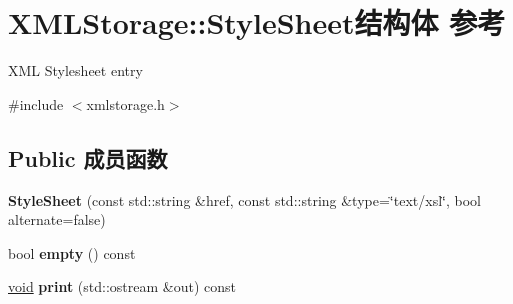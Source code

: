 \hypertarget{struct_x_m_l_storage_1_1_style_sheet}{}\section{X\+M\+L\+Storage\+:\+:Style\+Sheet结构体 参考}
\label{struct_x_m_l_storage_1_1_style_sheet}


X\+ML Stylesheet entry  




{\ttfamily \#include $<$xmlstorage.\+h$>$}

\subsection*{Public 成员函数}
\begin{DoxyCompactItemize}
\item 
\mbox{\label{struct_x_m_l_storage_1_1_style_sheet_aec0045fda8702d8eaa9ab7c4860d7263}} 
{\bfseries Style\+Sheet} (const std\+::string \&href, const std\+::string \&type=\char`\"{}text/xsl\char`\"{}, bool alternate=false)
\item 
\mbox{\label{struct_x_m_l_storage_1_1_style_sheet_a38dea62b0d3ad2f48a786119e11f2b17}} 
bool {\bfseries empty} () const
\item 
\mbox{\label{struct_x_m_l_storage_1_1_style_sheet_a33d9f78f36292a16aea293b0be120023}} 
\hyperlink{interfacevoid}{void} {\bfseries print} (std\+::ostream \&out) const
\end{DoxyCompactItemize}
